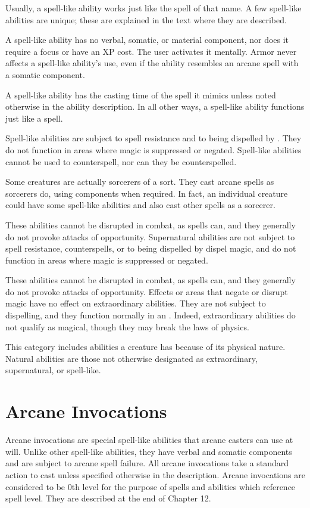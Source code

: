  Usually, a spell-like ability works just like the spell of that name. A few spell-like abilities are unique; these are explained in the text where they are described.

A spell-like ability has no verbal, somatic, or material component, nor does it require a focus or have an XP cost. The user activates it mentally. Armor never affects a spell-like ability's use, even if the ability resembles an arcane spell with a somatic component.

A spell-like ability has the casting time of the spell it mimics unless noted otherwise in the ability description. In all other ways, a spell-like ability functions just like a spell.

Spell-like abilities are subject to spell resistance and to being dispelled by . They do not function in areas where magic is suppressed or negated. Spell-like abilities cannot be used to counterspell, nor can they be counterspelled.

Some creatures are actually sorcerers of a sort. They cast arcane spells as sorcerers do, using components when required. In fact, an individual creature could have some spell-like abilities and also cast other spells as a sorcerer.

 These abilities cannot be disrupted in combat, as spells can, and they generally do not provoke attacks of opportunity. Supernatural abilities are not subject to spell resistance, counterspells, or to being dispelled by dispel magic, and do not function in areas where magic is suppressed or negated.

 These abilities cannot be disrupted in combat, as spells can, and they generally do not provoke attacks of opportunity. Effects or areas that negate or disrupt magic have no effect on extraordinary abilities. They are not subject to dispelling, and they function normally in an . Indeed, extraordinary abilities do not qualify as magical, though they may break the laws of physics.

 This category includes abilities a creature has because of its physical nature. Natural abilities are those not otherwise designated as extraordinary, supernatural, or spell-like.

\section{Arcane Invocations}
Arcane invocations are special spell-like abilities that arcane casters can use at will. Unlike other spell-like abilities, they have verbal and somatic components and are subject to arcane spell failure. All arcane invocations take a standard action to cast unless specified otherwise in the description. Arcane invocations are considered to be 0th level for the purpose of spells and abilities which reference spell level. They are described at the end of Chapter 12.

